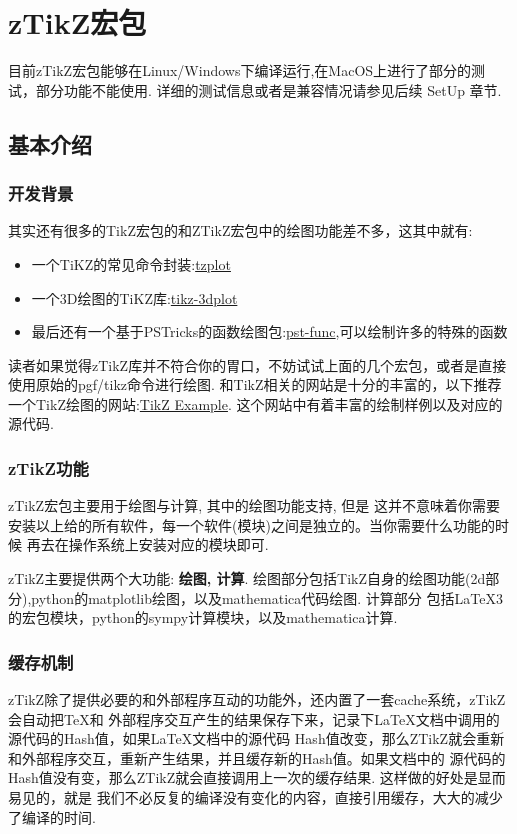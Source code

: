 \chapter{zTikZ{}宏包}\label{start-use-package}
目前zTikZ宏包能够在Linux/Windows下编译运行,在MacOS上进行了部分的测试，部分功能不能使用.
详细的测试信息或者是兼容情况请参见后续 SetUp 章节.

\section{基本介绍}
\subsection{开发背景}
其实还有很多的TikZ宏包的和ZTikZ宏包中的绘图功能差不多，这其中就有:
\begin{itemize}
    \item 一个TiKZ的常见命令封装:\href{https://ctan.org/tex-archive/graphics/pgf/contrib/tzplot}{tzplot}
    \item 一个3D绘图的TiKZ库:\href{https://ctan.org/pkg/tikz-3dplot}{tikz-3dplot}
    \item 最后还有一个基于PSTricks的函数绘图包:\href{https://ctan.org/pkg/pst-func}{pst-func},可以绘制许多的特殊的函数
\end{itemize}

读者如果觉得zTikZ库并不符合你的胃口，不妨试试上面的几个宏包，或者是直接使用原始的pgf/tikz命令进行绘图.
和TikZ相关的网站是十分的丰富的，以下推荐一个TikZ绘图的网站:\href{https://texample.net/tikz/examples/}{TikZ Example}.
这个网站中有着丰富的绘制样例以及对应的源代码.

\subsection{zTikZ{}功能}
zTikZ宏包主要用于绘图与计算, 其中的绘图功能支持, 但是
这并不意味着你需要安装以上给的所有软件，每一个软件(模块)之间是独立的。当你需要什么功能的时候
再去在操作系统上安装对应的模块即可.

zTikZ主要提供两个大功能: \textbf{绘图, 计算}.
绘图部分包括TikZ自身的绘图功能(2d部分),python的matplotlib绘图，以及mathematica代码绘图. 计算部分
包括\LaTeX3的宏包模块，python的sympy计算模块，以及mathematica计算. 

\subsection{缓存机制}
zTikZ除了提供必要的和外部程序互动的功能外，还内置了一套cache系统，zTikZ会自动把\TeX{}和
外部程序交互产生的结果保存下来，记录下\LaTeX{}文档中调用的源代码的Hash值，如果\LaTeX{}文档中的源代码
Hash值改变，那么ZTikZ就会重新和外部程序交互，重新产生结果，并且缓存新的Hash值。如果文档中的
源代码的Hash值没有变，那么ZTikZ就会直接调用上一次的缓存结果. 这样做的好处是显而易见的，就是
我们不必反复的编译没有变化的内容，直接引用缓存，大大的减少了编译的时间. 

